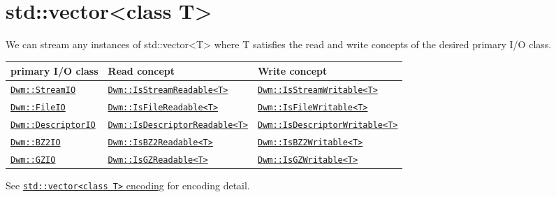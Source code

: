 \begin{minipage}{\textwidth}
\section{\ttfamily std::vector<class T>}
We can stream any instances of {\ttfamily std::vector<T>} where
{\ttfamily T} satisfies the read and write concepts of the desired
primary I/O class.
\vspace{1ex}

\begin{tabular}{lll}
  \textbf{primary I/O class} & \textbf{Read concept} & \textbf{Write concept} \\ \hline
  \hyperref[section:DwmStreamIOClass]{\texttt{Dwm::StreamIO}} & \hyperref[concept:DwmIsStreamReadable]{\texttt{Dwm::IsStreamReadable<T>}} & \hyperref[concept:DwmIsStreamWritable]{\texttt{Dwm::IsStreamWritable<T>}} \\
  \hyperref[section:DwmFileIOClass]{\texttt{Dwm::FileIO}} & \hyperref[concept:DwmIsFileReadable]{\texttt{Dwm::IsFileReadable<T>}} & \hyperref[concept:DwmIsFileWritable]{\texttt{Dwm::IsFileWritable<T>}} \\
  \hyperref[section:DwmDescriptorIOClass]{\texttt{Dwm::DescriptorIO}} & \hyperref[concept:DwmIsDescriptorReadable]{\texttt{Dwm::IsDescriptorReadable<T>}} & \hyperref[concept:DwmIsDescriptorWritable]{\texttt{Dwm::IsDescriptorWritable<T>}} \\
  \hyperref[section:DwmBZ2IOClass]{\texttt{Dwm::BZ2IO}} & \hyperref[concept:DwmIsBZ2Readable]{\texttt{Dwm::IsBZ2Readable<T>}} & \hyperref[concept:DwmIsBZ2Writable]{\texttt{Dwm::IsBZ2Writable<T>}} \\
  \hyperref[section:DwmGZIOClass]{\texttt{Dwm::GZIO}} & \hyperref[concept:DwmIsGZReadable]{\texttt{Dwm::IsGZReadable<T>}} & \hyperref[concept:DwmIsGZWritable]{\texttt{Dwm::IsGZWritable<T>}} \\
\end{tabular}
\vspace{1ex}

See \hyperref[encoding:stdVector]{\texttt{std::vector<class T>} encoding} for
encoding detail.
\end{minipage}
